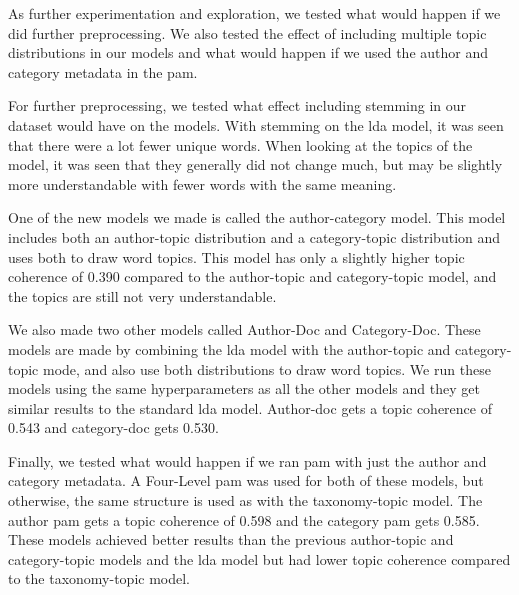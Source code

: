 As further experimentation and exploration, we tested what would happen if we did further preprocessing.
We also tested the effect of including multiple topic distributions in our models and what would happen if we used the author and category metadata in the \gls{pam}.

For further preprocessing, we tested what effect including stemming in our dataset would have on the models.
With stemming on the \gls{lda} model, it was seen that there were a lot fewer unique words.
When looking at the topics of the model, it was seen that they generally did not change much, but may be slightly more understandable with fewer words with the same meaning.

One of the new models we made is called the author-category model.
This model includes both an author-topic distribution and a category-topic distribution and uses both to draw word topics.
This model has only a slightly higher topic coherence of 0.390 compared to the author-topic and category-topic model, and the topics are still not very understandable.

We also made two other models called Author-Doc and Category-Doc.
These models are made by combining the \gls{lda} model with the author-topic and category-topic mode, and also use both distributions to draw word topics.
We run these models using the same hyperparameters as all the other models and they get similar results to the standard \gls{lda} model.
Author-doc gets a topic coherence of 0.543 and category-doc gets 0.530.

Finally, we tested what would happen if we ran \gls{pam} with just the author and category metadata.
A Four-Level \gls{pam} was used for both of these models, but otherwise, the same structure is used as with the taxonomy-topic model.
The author \gls{pam} gets a topic coherence of 0.598 and the category \gls{pam} gets 0.585.
These models achieved better results than the previous author-topic and category-topic models and the \gls{lda} model but had lower topic coherence compared to the taxonomy-topic model.
